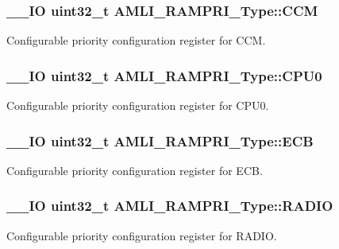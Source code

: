 \subsubsection[{C\+C\+M}]{\setlength{\rightskip}{0pt plus 5cm}\+\_\+\+\_\+\+I\+O uint32\+\_\+t A\+M\+L\+I\+\_\+\+R\+A\+M\+P\+R\+I\+\_\+\+Type\+::\+C\+C\+M}\label{struct_a_m_l_i___r_a_m_p_r_i___type_ad1919e101695c6e9e8de0ded7fa51ff4}
Configurable priority configuration register for C\+C\+M. \hypertarget{struct_a_m_l_i___r_a_m_p_r_i___type_a24f318f0a5da0b14195f00b01cb44e69}{}
\subsubsection[{C\+P\+U0}]{\setlength{\rightskip}{0pt plus 5cm}\+\_\+\+\_\+\+I\+O uint32\+\_\+t A\+M\+L\+I\+\_\+\+R\+A\+M\+P\+R\+I\+\_\+\+Type\+::\+C\+P\+U0}\label{struct_a_m_l_i___r_a_m_p_r_i___type_a24f318f0a5da0b14195f00b01cb44e69}
Configurable priority configuration register for C\+P\+U0. \hypertarget{struct_a_m_l_i___r_a_m_p_r_i___type_a85cfdf4e72c900e47d9cedfd40df6a81}{}
\subsubsection[{E\+C\+B}]{\setlength{\rightskip}{0pt plus 5cm}\+\_\+\+\_\+\+I\+O uint32\+\_\+t A\+M\+L\+I\+\_\+\+R\+A\+M\+P\+R\+I\+\_\+\+Type\+::\+E\+C\+B}\label{struct_a_m_l_i___r_a_m_p_r_i___type_a85cfdf4e72c900e47d9cedfd40df6a81}
Configurable priority configuration register for E\+C\+B. \hypertarget{struct_a_m_l_i___r_a_m_p_r_i___type_a74bd58f9a1141c954a9922fb2945d24b}{}
\subsubsection[{R\+A\+D\+I\+O}]{\setlength{\rightskip}{0pt plus 5cm}\+\_\+\+\_\+\+I\+O uint32\+\_\+t A\+M\+L\+I\+\_\+\+R\+A\+M\+P\+R\+I\+\_\+\+Type\+::\+R\+A\+D\+I\+O}\label{struct_a_m_l_i___r_a_m_p_r_i___type_a74bd58f9a1141c954a9922fb2945d24b}
Configurable priority configuration register for R\+A\+D\+I\+O. \hypertarget{struct_a_m_l_i___r_a_m_p_r_i___type_a92854848d086cfe7e1239e0cb30316e4}{}
